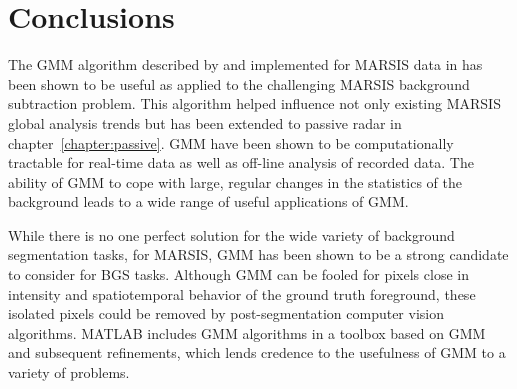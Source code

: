 \section{Conclusions}
The GMM algorithm described by \citet{stauffer1999,kaew2001} and implemented for MARSIS data in \citet{cvmarsis} has been shown to be useful as applied to the challenging MARSIS background subtraction problem. 
This algorithm helped influence not only existing MARSIS global analysis trends but has been extended to passive radar in chapter~\ref{chapter:passive}. 
GMM have been shown to be computationally tractable for real-time data as well as off-line analysis of recorded data. 
The ability of GMM to cope with large, regular changes in the statistics of the background leads to a wide range of useful applications of GMM.

While there is no one perfect solution for the wide variety of background segmentation tasks, for MARSIS, GMM has been shown to be a strong candidate to consider for BGS tasks. 
Although GMM can be fooled for pixels close in intensity and spatiotemporal behavior of the ground truth foreground, these isolated pixels could be removed by post-segmentation computer vision algorithms. 
MATLAB includes GMM algorithms in a toolbox based on GMM and subsequent refinements, which lends credence to the usefulness of GMM to a variety of problems. 
